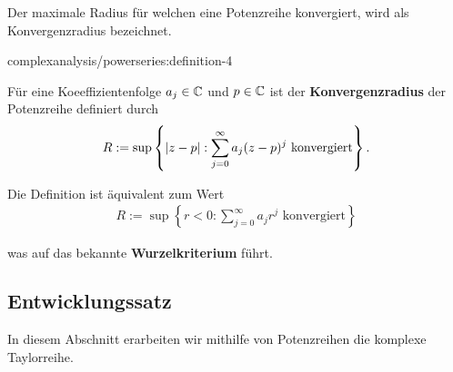 \par
Der maximale Radius für welchen eine Potenzreihe konvergiert, wird als Konvergenzradius bezeichnet.
\begin{definition}{}{complexanalysis/powerseries:definition-4}



\par
Für eine Koeeffizientenfolge \(a_j\in\mathbb{C}\) und \(p\in\mathbb{C}\) ist der \textbf{Konvergenzradius} der Potenzreihe definiert durch
\begin{align*}
R :=\sup\left\{\vert z - p \vert: \sum_{j=0}^\infty a_j (z-p)^j \text{ konvergiert}\right\}.
\end{align*}\end{definition}

\par
Die Definition ist äquivalent zum Wert
\begin{align*}
R :=\sup\left\{r<0: \sum_{j=0}^\infty a_j r^j\text{ konvergiert} \right\}
\end{align*}
\par
was auf das bekannte \textbf{Wurzelkriterium} führt.


\subsection{Entwicklungssatz}
\label{\detokenize{complexanalysis/powerseries:entwicklungssatz}}
\par
In diesem Abschnitt erarbeiten wir mithilfe von Potenzreihen die komplexe Taylorreihe.

